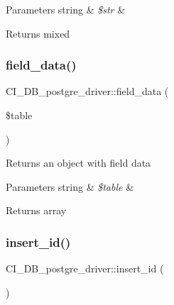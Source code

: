 \begin{DoxyParams}[1]{Parameters}
string & {\em \$str} & \\
\hline
\end{DoxyParams}
\begin{DoxyReturn}{Returns}
mixed 
\end{DoxyReturn}
\mbox{\label{class_c_i___d_b__postgre__driver_ac07826d01e7a000b7ba61f735133b8ba}} 
\subsubsection{\texorpdfstring{field\+\_\+data()}{field\_data()}}
{\footnotesize\ttfamily C\+I\+\_\+\+D\+B\+\_\+postgre\+\_\+driver\+::field\+\_\+data (\begin{DoxyParamCaption}\item[{}]{\$table }\end{DoxyParamCaption})}

Returns an object with field data


\begin{DoxyParams}[1]{Parameters}
string & {\em \$table} & \\
\hline
\end{DoxyParams}
\begin{DoxyReturn}{Returns}
array 
\end{DoxyReturn}
\mbox{\label{class_c_i___d_b__postgre__driver_a1bf025995b0b8f14bfaa40a3ca868ce6}} 
\subsubsection{\texorpdfstring{insert\+\_\+id()}{insert\_id()}}
{\footnotesize\ttfamily C\+I\+\_\+\+D\+B\+\_\+postgre\+\_\+driver\+::insert\+\_\+id (\begin{DoxyParamCaption}{ }\end{DoxyParamCaption})}

